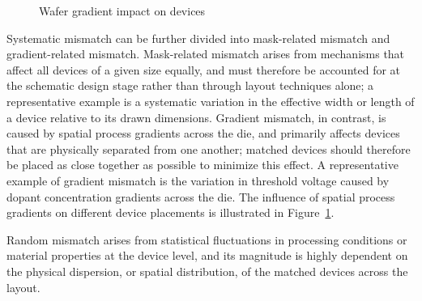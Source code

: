 \begin{figure}[h]
    \caption{Wafer gradient impact on devices}\label{fig:wafer_gradient}
\end{figure}

Systematic mismatch can be further divided into mask-related mismatch and gradient-related mismatch. Mask-related mismatch arises from mechanisms that affect all devices of a given size equally, and must therefore be accounted for at the schematic design stage rather than through layout techniques alone; a representative example is a systematic variation in the effective width or length of a device relative to its drawn dimensions. Gradient mismatch, in contrast, is caused by spatial process gradients across the die, and primarily affects devices that are physically separated from one another; matched devices should therefore be placed as close together as possible to minimize this effect. A representative example of gradient mismatch is the variation in threshold voltage caused by dopant concentration gradients across the die.
The influence of spatial process gradients on different device placements is illustrated in Figure~\ref{fig:wafer_gradient}.

Random mismatch arises from statistical fluctuations in processing conditions or material properties at the device level, and its magnitude is highly dependent on the physical dispersion, or spatial distribution, of the matched devices across the layout.


